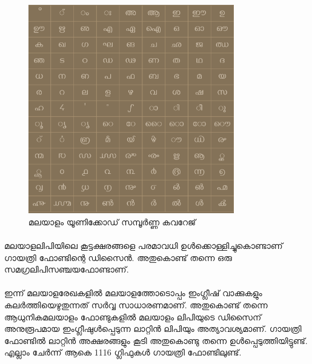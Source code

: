 \documentclass[12pt]{article}
\begin{document}
	\begin{figure}
		\begin{centering}
			\includegraphics[width=0.8\textwidth]{ml-unicode.png}
			\caption{മലയാളം യൂണിക്കോഡ് സമ്പൂര്‍ണ്ണ കവറേജ്}
			\label{unicode}
		\end{centering}
	\end{figure}
	
	\paragraph{}
	മലയാളലിപിയിലെ കൂട്ടക്ഷരങ്ങളെ പരമാവധി ഉള്‍ക്കൊള്ളിച്ചുകൊണ്ടാണ് ഗായത്രി ഫോണ്ടിന്റെ ഡിസൈന്‍. അതുകൊണ്ട് തന്നെ ഒരു സമഗ്രലിപിസഞ്ചയഫോണ്ടാണ്.
	
	\paragraph{}
	ഇന്ന് മലയാളരേഖകളില്‍ മലയാളത്തോടൊപ്പം ഇംഗ്ലീഷ് വാക്കുകളും കലര്‍ത്തിയെഴുതുന്നത് സര്‍വ്വ സാധാരണമാണ്. അതുകൊണ്ട് തന്നെ ആധുനികമലയാളം ഫോണ്ടുകളില്‍ മലയാളം ലിപിയുടെ ഡിസൈന് അനുരൂപമായ ഇംഗ്ലീഷുള്‍പ്പെടുന്ന ലാറ്റിന്‍ ലിപിയും അത്യാവശ്യമാണ്. ഗായത്രി ഫോണ്ടില്‍ ലാറ്റിന്‍ അക്ഷരങ്ങളും കൂടി അതുകൊണ്ടു തന്നെ ഉള്‍പ്പെടുത്തിയിട്ടുണ്ട്.  എല്ലാം ചേര്‍ന്ന് ആകെ 1116 ഗ്ലിഫുകള്‍ ഗായത്രി ഫോണ്ടിലുണ്ട്. 
	
\end{document}
